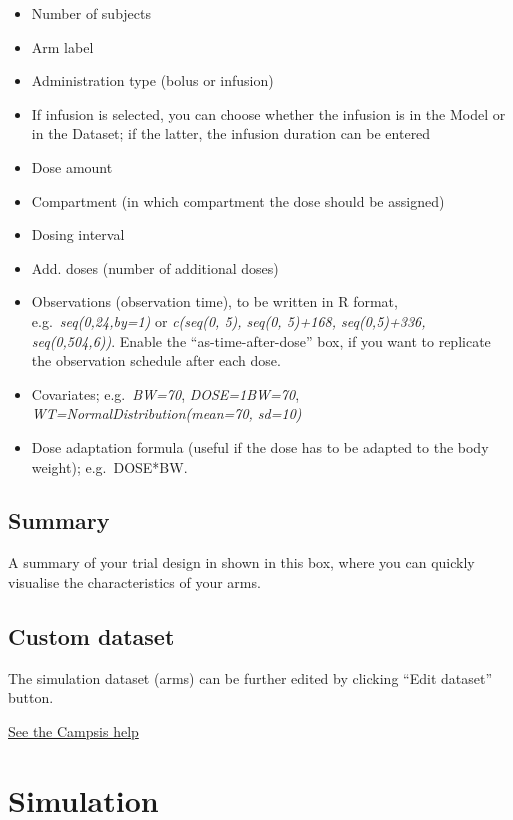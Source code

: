 \documentclass[
]{book}
\providecommand{\tightlist}{%
  \setlength{\itemsep}{0pt}\setlength{\parskip}{0pt}}
\begin{document}
\begin{itemize}
\tightlist
\item
  Number of subjects
\item
  Arm label
\item
  Administration type (bolus or infusion)
\item
  If infusion is selected, you can choose whether the infusion is in the Model or in the Dataset; if the latter, the infusion duration can be entered
\item
  Dose amount
\item
  Compartment (in which compartment the dose should be assigned)
\item
  Dosing interval
\item
  Add. doses (number of additional doses)
\item
  Observations (observation time), to be written in R format, e.g.~\emph{seq(0,24,by=1)} or \emph{c(seq(0, 5), seq(0, 5)+168, seq(0,5)+336, seq(0,504,6))}. Enable the ``as-time-after-dose'' box, if you want to replicate the observation schedule after each dose.
\item
  Covariates; e.g.~\emph{BW=70}, \emph{DOSE=1\textbar BW=70}, \emph{WT=NormalDistribution(mean=70, sd=10)}
\item
  Dose adaptation formula (useful if the dose has to be adapted to the body weight); e.g.~DOSE*BW.
\end{itemize}

\hypertarget{summary}{%
\section{Summary}\label{summary}}

A summary of your trial design in shown in this box, where you can quickly visualise the characteristics of your arms.

\hypertarget{custom-dataset}{%
\section{Custom dataset}\label{custom-dataset}}

The simulation dataset (arms) can be further edited by clicking ``Edit dataset'' button.

\href{https://calvagone.github.io/campsis.doc/articles/v01_dataset.html}{See the Campsis help}

\hypertarget{simulation}{%
\chapter{Simulation}\label{simulation}}
\end{document}
